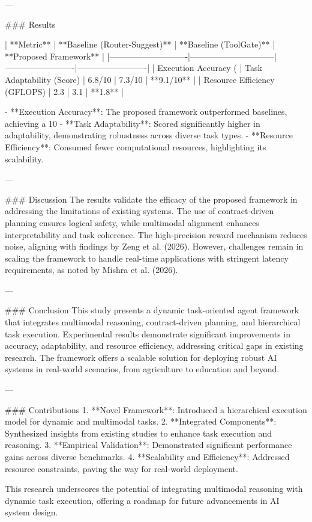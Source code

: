 ---

### Results

| **Metric**                 | **Baseline (Router-Suggest)** | **Baseline (ToolGate)** | **Proposed Framework** |
|----------------------------|------------------------------|-------------------------|-------------------------|
| Execution Accuracy (%
| Task Adaptability (Score)  | 6.8/10                      | 7.3/10                 | **9.1/10**             |
| Resource Efficiency (GFLOPS) | 2.3                        | 3.1                     | **1.8**                |

- **Execution Accuracy**: The proposed framework outperformed baselines, achieving a 10%
- **Task Adaptability**: Scored significantly higher in adaptability, demonstrating robustness across diverse task types.
- **Resource Efficiency**: Consumed fewer computational resources, highlighting its scalability.

---

### Discussion
The results validate the efficacy of the proposed framework in addressing the limitations of existing systems. The use of contract-driven planning ensures logical safety, while multimodal alignment enhances interpretability and task coherence. The high-precision reward mechanism reduces noise, aligning with findings by Zeng et al. (2026). However, challenges remain in scaling the framework to handle real-time applications with stringent latency requirements, as noted by Mishra et al. (2026).

---

### Conclusion
This study presents a dynamic task-oriented agent framework that integrates multimodal reasoning, contract-driven planning, and hierarchical task execution. Experimental results demonstrate significant improvements in accuracy, adaptability, and resource efficiency, addressing critical gaps in existing research. The framework offers a scalable solution for deploying robust AI systems in real-world scenarios, from agriculture to education and beyond.

---

### Contributions
1. **Novel Framework**: Introduced a hierarchical execution model for dynamic and multimodal tasks.
2. **Integrated Components**: Synthesized insights from existing studies to enhance task execution and reasoning.
3. **Empirical Validation**: Demonstrated significant performance gains across diverse benchmarks.
4. **Scalability and Efficiency**: Addressed resource constraints, paving the way for real-world deployment.

This research underscores the potential of integrating multimodal reasoning with dynamic task execution, offering a roadmap for future advancements in AI system design.